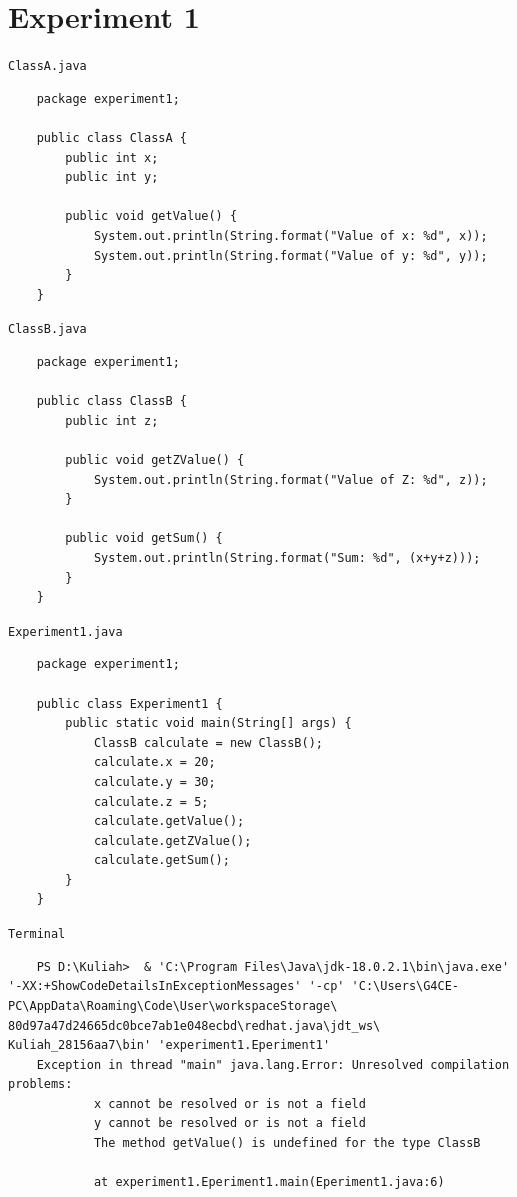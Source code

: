 \documentclass[12pt,titlepage]{article}
\begin{document}
\section{Experiment 1}
\texttt{ClassA.java}
\begin{verbatim}
    package experiment1;

    public class ClassA {
        public int x;
        public int y;

        public void getValue() {
            System.out.println(String.format("Value of x: %d", x));
            System.out.println(String.format("Value of y: %d", y));
        }
    }
\end{verbatim}
\texttt{ClassB.java}
\begin{verbatim}
    package experiment1;

    public class ClassB {
        public int z;

        public void getZValue() {
            System.out.println(String.format("Value of Z: %d", z));
        }

        public void getSum() {
            System.out.println(String.format("Sum: %d", (x+y+z)));
        }
    }
\end{verbatim}
\texttt{Experiment1.java}
\begin{verbatim}
    package experiment1;

    public class Experiment1 {
        public static void main(String[] args) {
            ClassB calculate = new ClassB();
            calculate.x = 20;
            calculate.y = 30;
            calculate.z = 5;
            calculate.getValue();
            calculate.getZValue();
            calculate.getSum();
        }
    }
\end{verbatim}
\texttt{Terminal}
\begin{verbatim}
    PS D:\Kuliah>  & 'C:\Program Files\Java\jdk-18.0.2.1\bin\java.exe' '-XX:+ShowCodeDetailsInExceptionMessages' '-cp' 'C:\Users\G4CE-PC\AppData\Roaming\Code\User\workspaceStorage\ 80d97a47d24665dc0bce7ab1e048ecbd\redhat.java\jdt_ws\ Kuliah_28156aa7\bin' 'experiment1.Eperiment1'
    Exception in thread "main" java.lang.Error: Unresolved compilation problems: 
            x cannot be resolved or is not a field
            y cannot be resolved or is not a field
            The method getValue() is undefined for the type ClassB

            at experiment1.Eperiment1.main(Eperiment1.java:6)
\end{verbatim}
\end{document}
